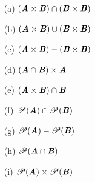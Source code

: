 \documentclass[12pt]{amsart}
\numberwithin{equation}{section}
\theoremstyle{definition}
\theoremstyle{remark}
\begin{document}
\begin{enumerate}

\item[(a)]
$ ( \textbf{\textit{A}} \times \textbf{\textit{B}} ) \cap ( \textbf{\textit{B}} \times \textbf{\textit{B}} ) $

\item[(b)]
$ ( \textbf{\textit{A}} \times \textbf{\textit{B}} ) \cup ( \textbf{\textit{B}} \times \textbf{\textit{B}} ) $

\item[(c)]
$ ( \textbf{\textit{A}} \times \textbf{\textit{B}} ) - ( \textbf{\textit{B}} \times \textbf{\textit{B}} ) $

\item[(d)]
$ ( \textbf{\textit{A}} \cap \textbf{\textit{B}} ) \times \textbf{\textit{A}} $

\item[(e)]
$ ( \textbf{\textit{A}} \times \textbf{\textit{B}} ) \cap \textbf{\textit{B}} $

\item[(f)]
$ \mathscr{P}( \textbf{\textit{A}} ) \cap \mathscr{P}( \textbf{\textit{B}} ) $

\item[(g)]
$ \mathscr{P}( \textbf{\textit{A}} ) - \mathscr{P}( \textbf{\textit{B}} ) $

\item[(h)]
$ \mathscr{P}( \textbf{\textit{A}} \cap \textbf{\textit{B}} ) $

\item[(i)]
$ \mathscr{P}( \textbf{\textit{A}} ) \times \mathscr{P}( \textbf{\textit{B}} ) $

\end{enumerate}
\end{document}
